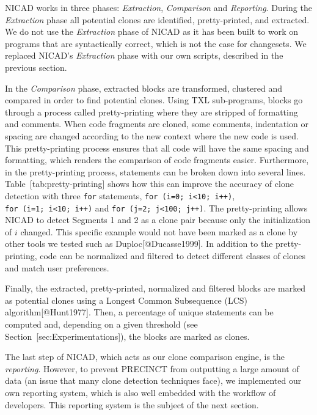 NICAD works in three phases: \emph{Extraction}, \emph{Comparison} and
\emph{Reporting}. During the \emph{Extraction} phase all potential
clones are identified, pretty-printed, and extracted. We do not use the
\emph{Extraction} phase of NICAD as it has been built to work on
programs that are syntactically correct, which is not the case for
changesets. We replaced NICAD's \emph{Extraction} phase with our own
scripts, described in the previous section.

In the \emph{Comparison} phase, extracted blocks are transformed,
clustered and compared in order to find potential clones. Using TXL
sub-programs, blocks go through a process called pretty-printing where
they are stripped of formatting and comments. When code fragments are
cloned, some comments, indentation or spacing are changed according to
the new context where the new code is used. This pretty-printing process
ensures that all code will have the same spacing and formatting, which
renders the comparison of code fragments easier. Furthermore, in the
pretty-printing process, statements can be broken down into several
lines. Table~{[}tab:pretty-printing{]} shows how this can improve the
accuracy of clone detection with three \texttt{for} statements,
\texttt{for\ (i=0;\ i\textless{}10;\ i++)},
\texttt{for\ (i=1;\ i\textless{}10;\ i++)} and
\texttt{for\ (j=2;\ j\textless{}100;\ j++)}. The pretty-printing allows
NICAD to detect Segments 1 and 2 as a clone pair because only the
initialization of \(i\) changed. This specific example would not have
been marked as a clone by other tools we tested such as
Duploc{[}@Ducasse1999{]}. In addition to the pretty-printing, code can
be normalized and filtered to detect different classes of clones and
match user preferences.

Finally, the extracted, pretty-printed, normalized and filtered blocks
are marked as potential clones using a Longest Common Subsequence (LCS)
algorithm{[}@Hunt1977{]}. Then, a percentage of unique statements can be
computed and, depending on a given threshold (see
Section~{[}sec:Experimentations{]}), the blocks are marked as clones.

The last step of NICAD, which acts as our clone comparison engine, is
the \emph{reporting}. However, to prevent PRECINCT from outputting a
large amount of data (an issue that many clone detection techniques
face), we implemented our own reporting system, which is also well
embedded with the workflow of developers. This reporting system is the
subject of the next section.

